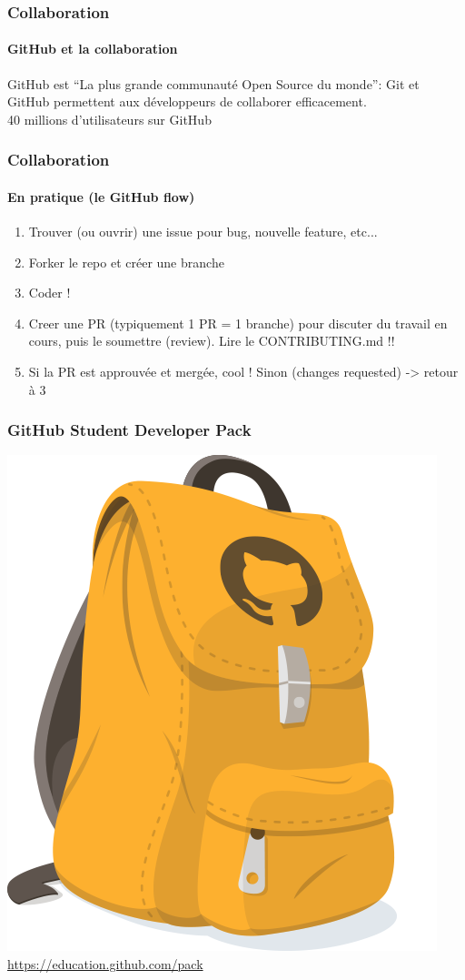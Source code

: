 \documentclass[aspectratio=169]{beamer}
\begin{document}
\begin{frame}
  \frametitle{Collaboration}
  \framesubtitle{GitHub et la collaboration}
  \centering
  GitHub est ``La plus grande communauté Open Source du monde'': Git et GitHub permettent aux développeurs de collaborer efficacement.\\
  \vspace{10pt}
  40 millions d'utilisateurs sur GitHub
\end{frame}

\begin{frame}
  \frametitle{Collaboration}
  \framesubtitle{En pratique (le GitHub flow)}
  \begin{enumerate}
  \item Trouver (ou ouvrir) une issue pour bug, nouvelle feature, etc...
  \item Forker le repo et créer une branche
  \item Coder !
  \item Creer une PR (typiquement 1 PR = 1 branche) pour discuter du travail en cours, puis le soumettre (review). Lire le CONTRIBUTING.md !!
  \item Si la PR est approuvée et mergée, cool ! Sinon (changes requested) -> retour à 3
  \end{enumerate}
\end{frame}

\begin{frame}
  \frametitle{GitHub Student Developer Pack}
  \centering
  \includegraphics[height=0.5\paperheight]{student-dev-pack.png}\\
  \url{https://education.github.com/pack}
\end{frame}
\end{document}
